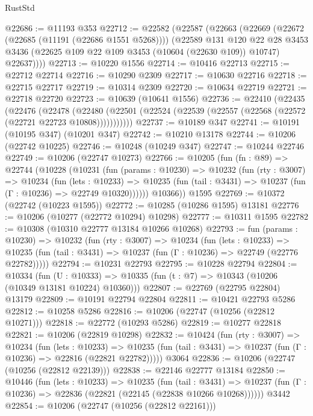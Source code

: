 \begin{lexlean}{RustStd}
\begin{coremodule}
@22686 := @11193 @353
@22712 := @22582
    (@22587
      (@22663
        (@22669
          (@22672 (@22685 (@11191 (@22686 @1551 @5268))))
          (@22589
            @131
            @120
            @22
            @28
            @3453
            @3436
            (@22625 @109 @22 @109 @3453 (@10604 (@22630 @109)) @10747)
            @22637))))
@22713 := @10220 @1556
@22714 := @10416 @22713
@22715 := @22712 @22714
@22716 := @10290 @2309
@22717 := @10630 @22716
@22718 := @22715 @22717
@22719 := @10314 @2309
@22720 := @10634 @22719
@22721 := @22718 @22720
@22723 := @10639 (@10641 @1556)
@22736 := @22410
    (@22435
      (@22476
        (@22478
          (@22480 (@22501 (@22524 (@22539 (@22557 (@22568 (@22572 (@22721 @22723 @10808)))))))))))
@22737 := @10189 @347
@22741 := @10191 (@10195 @347) (@10201 @347)
@22742 := @10210 @13178
@22744 := @10206 (@22742 @10225)
@22746 := @10248 (@10249 @347)
@22747 := @10244 @22746
@22749 := @10206 (@22747 @10273)
@22766 := @10205
    (fun (fn : @89) =>
    @22744
      (@10228
        (@10231
          (fun (params : @10230) =>
          @10232
            (fun (rty : @3007) =>
            @10234
              (fun (lets : @10233) =>
              @10235 (fun (tail : @3431) => @10237 (fun (Γ : @10236) => @22749 @10320))))))
        @10366))
    @1595
@22769 := @10372 (@22742 (@10223 @1595))
@22772 := @10285 (@10286 @1595) @13181
@22776 := @10206 (@10277 (@22772 @10294) @10298)
@22777 := @10311 @1595
@22782 := @10308 (@10310 @22777 @13184 @10266 @10268)
@22793 := fun (params : @10230) =>
  @10232
    (fun (rty : @3007) =>
    @10234
      (fun (lets : @10233) =>
      @10235 (fun (tail : @3431) => @10237 (fun (Γ : @10236) => @22749 (@22776 @22782)))))
@22794 := @10231 @22793
@22795 := @10228 @22794
@22804 := @10334
    (fun (U : @10333) => @10335 (fun (t : @7) => @10343 (@10206 (@10349 @13181 @10224) @10360)))
@22807 := @22769 (@22795 @22804) @13179
@22809 := @10191 @22794 @22804
@22811 := @10421 @22793 @5286
@22812 := @10258 @5286
@22816 := @10206 (@22747 (@10256 (@22812 @10271)))
@22818 := @22772 (@10293 @5286)
@22819 := @10277 @22818
@22821 := @10206 (@22819 @10298)
@22832 := @10424
    (fun (rty : @3007) =>
    @10234
      (fun (lets : @10233) =>
      @10235 (fun (tail : @3431) => @10237 (fun (Γ : @10236) => @22816 (@22821 @22782)))))
    @3064
@22836 := @10206 (@22747 (@10256 (@22812 @22139)))
@22838 := @22146 @22777 @13184
@22850 := @10446
    (fun (lets : @10233) =>
    @10235
      (fun (tail : @3431) =>
      @10237 (fun (Γ : @10236) => @22836 (@22821 (@22145 (@22838 @10266 @10268))))))
    @3442
@22854 := @10206 (@22747 (@10256 (@22812 @22161)))

\end{coremodule}
\end{lexlean}
